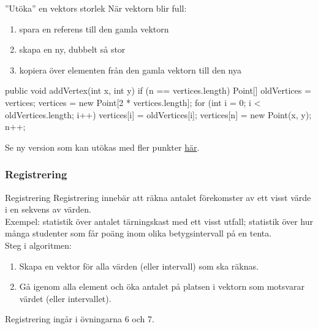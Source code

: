 \documentclass{lecturenotes}
\begin{document}
\begin{Slide}{''Utöka'' en vektors storlek}
När vektorn  blir full: 
\begin{enumerate}
\item spara en referens till den gamla vektorn
\item skapa en ny, dubbelt så stor
\item kopiera över elementen från den gamla vektorn till den nya
\end{enumerate}
\begin{Code}
public void addVertex(int x, int y) {
    if (n == vertices.length) {
        Point[] oldVertices = vertices;
        vertices = new Point[2 * vertices.length];
        for (int i = 0; i < oldVertices.length; i++) {
            vertices[i] = oldVertices[i];
        }
    }
    vertices[n] = new Point(x, y);
    n++;
}
\end{Code}
Se ny version  som kan utökas med fler punkter \href{https://github.com/bjornregnell/lth-eda016-2015/blob/master/lectures/examples/eclipse-ws/lecture-examples/src/week06/Polygon.java}{här}.
\end{Slide} 

\subsubsection{Registrering}
\begin{Slide}{Registrering}\footnotesize
Registrering  innebär att räkna antalet förekomster av ett visst värde i en sekvens av värden. 
\\ \vspace{1em} 
Exempel: statistik över antalet tärningskast med ett visst utfall; statistik över hur många studenter som får poäng inom olika betygsintervall på en tenta. 
\\ \vspace{1em} 
Steg i algoritmen:
\begin{enumerate}
\item Skapa en vektor för alla värden (eller intervall) som ska räknas.
\item Gå igenom alla element och öka antalet på platsen i vektorn som motsvarar värdet (eller intervallet).
\end{enumerate}
Registrering ingår i övningarna 6 och 7. 
\end{Slide}
\end{document}
